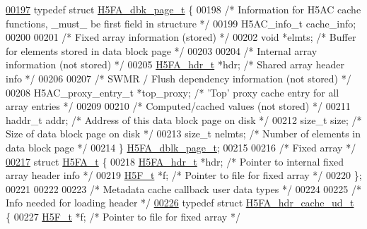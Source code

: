 \begin{DoxyCode}
\hyperlink{struct_h5_f_a__dbk__page__t}{00197} \textcolor{keyword}{typedef} \textcolor{keyword}{struct }\hyperlink{struct_h5_f_a__dbk__page__t}{H5FA\_dbk\_page\_t} \{
00198     \textcolor{comment}{/* Information for H5AC cache functions, \_must\_ be first field in structure */}
00199     H5AC\_info\_t cache\_info;
00200 
00201     \textcolor{comment}{/* Fixed array information (stored) */}
00202     \textcolor{keywordtype}{void}        *elmts;         \textcolor{comment}{/* Buffer for elements stored in data block page */}
00203 
00204     \textcolor{comment}{/* Internal array information (not stored) */}
00205     \hyperlink{struct_h5_f_a__hdr__t}{H5FA\_hdr\_t}    *hdr;         \textcolor{comment}{/* Shared array header info                     */}
00206 
00207     \textcolor{comment}{/* SWMR / Flush dependency information (not stored) */}
00208     H5AC\_proxy\_entry\_t *top\_proxy;      \textcolor{comment}{/* 'Top' proxy cache entry for all array entries */}
00209 
00210     \textcolor{comment}{/* Computed/cached values (not stored) */}
00211     haddr\_t     addr;           \textcolor{comment}{/* Address of this data block page on disk      */}
00212     \textcolor{keywordtype}{size\_t}      size;           \textcolor{comment}{/* Size of data block page on disk              */}
00213     \textcolor{keywordtype}{size\_t}      nelmts;         \textcolor{comment}{/* Number of elements in data block page        */}
00214 \} \hyperlink{struct_h5_f_a__dbk__page__t}{H5FA\_dblk\_page\_t};
00215 
00216 \textcolor{comment}{/* Fixed array */}
\hyperlink{struct_h5_f_a__t}{00217} \textcolor{keyword}{struct }\hyperlink{struct_h5_f_a__t}{H5FA\_t} \{
00218     \hyperlink{struct_h5_f_a__hdr__t}{H5FA\_hdr\_t}  *hdr;           \textcolor{comment}{/* Pointer to internal fixed array header info  */}
00219     \hyperlink{struct_h5_f__t}{H5F\_t}      *f;              \textcolor{comment}{/* Pointer to file for fixed array              */}
00220 \};
00221 
00222 
00223 \textcolor{comment}{/* Metadata cache callback user data types */}
00224 
00225 \textcolor{comment}{/* Info needed for loading header */}
\hyperlink{struct_h5_f_a__hdr__cache__ud__t}{00226} \textcolor{keyword}{typedef} \textcolor{keyword}{struct }\hyperlink{struct_h5_f_a__hdr__cache__ud__t}{H5FA\_hdr\_cache\_ud\_t} \{
00227     \hyperlink{struct_h5_f__t}{H5F\_t}      *f;              \textcolor{comment}{/* Pointer to file for fixed array */}

\end{DoxyCode}
